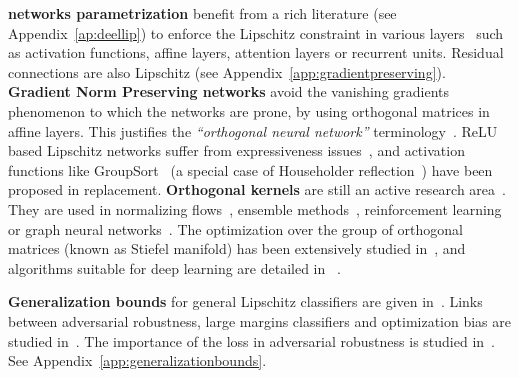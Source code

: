 \textbf{\LipCl networks parametrization} benefit from a rich literature (see Appendix~\ref{ap:deellip}) to enforce the Lipschitz constraint in various layers~\cite{gulrajani2017improved, yoshida2017spectral, arjovsky2017wasserstein, salimans2016weight, kim2020lipschitz, miyato2018spectral, helfrich2018orthogonal, erichson2021lipschitz, huang2021training, zhu2022controlling} such as activation functions, affine layers, attention layers or recurrent units. Residual connections are also Lipschitz (see Appendix~\ref{app:gradientpreserving}). \textbf{Gradient Norm Preserving networks} avoid the vanishing gradients~\cite{li2019preventing,bansal2018can} phenomenon to which the \LipCl networks are prone, by using orthogonal matrices in affine layers. This justifies the \textit{``orthogonal neural network''} terminology~\cite{stasiak2006fast,li2019orthogonal,su2021scaling}. ReLU based Lipschitz networks suffer from expressiveness issues~\cite{anil2019sorting}, and activation functions like GroupSort~\cite{anil2019sorting,tanielian2021approximating} (a special case of Householder reflection~\cite{mhammedi2017efficient,singla2021improved}) have been proposed in replacement. %
\textbf{Orthogonal kernels} are still an active research area~\cite{gayer2020convolutional,wang2020orthogonal,liu2021convolutional,achour2021existence,li2019preventing,trockman2021orthogonalizing,singla2021skew,yu2021constructing}. They are used in normalizing flows~\cite{hasenclever2017variational}, ensemble methods~\cite{mashhadi2021parallel}, reinforcement learning~\cite{Gogianu2021} or graph neural networks~\cite{pmlr-v139-dasoulas21a}. The optimization over the group of orthogonal matrices (known as Stiefel manifold) has been extensively studied in~\cite{absil2009optimization}, and algorithms suitable for deep learning are detailed in ~\cite{arjovsky2016unitary,hyland2017learning,hyland2017learning,lezcano2019cheap,huang2018orthogonal,ablin2021fast,kerenidis2021classical,choromanski2020stochastic}.   
  
\textbf{Generalization bounds} for general Lipschitz classifiers are given in~\cite{von2004distance,gottlieb2014efficient,bartlett2017spectrally}. Links between adversarial robustness, large margins classifiers and optimization bias are studied in~\cite{finlay2018lipschitz,jiang2018predicting,NEURIPS2018_48584348,faghri2021bridging}. The importance of the loss in adversarial robustness is studied in~\cite{pang2019rethinking}. See Appendix~\ref{app:generalizationbounds}.
